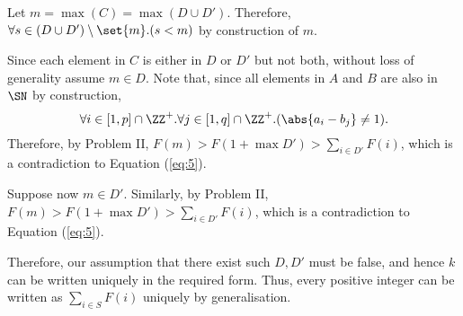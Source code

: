 \documentclass[11pt, letterpaper]{scrartcl}
\begin{document}
\begin{soln}
Let $m = \max(C) = \max(D\cup D')$. Therefore,
$\forall s \in (D\cup D')\setminus \set{m}.(s< m)$ by construction of
$m$.

Since each element in $C$ is either in $D$ or $D'$ but not both,
without loss of generality assume $m\in D$.  Note that, since all
elements in $A$ and $B$ are also in $\SN$ by construction,
\[\forall i\in[1, p]\cap\ZZ^+.\forall j\in[1, q]\cap\ZZ^+.(\abs{a_i -
    b_j}\neq 1).\] Therefore, by Problem II,
$F(m) > F(1+\max D')> \sum_{i\in D'}F(i)$, which is a contradiction to
Equation (\ref{eq:5}).

Suppose now $m\in D'$. Similarly, by Problem II,
$F(m) > F(1+\max D')> \sum_{i\in D'}F(i)$, which is a contradiction to
Equation (\ref{eq:5}).

Therefore, our assumption that there exist such $D, D'$ must be false,
and hence $k$ can be written uniquely in the required form. Thus,
every positive integer can be written as $\sum_{i\in S}F(i)$ uniquely
by generalisation.






\end{soln}
\end{document}
